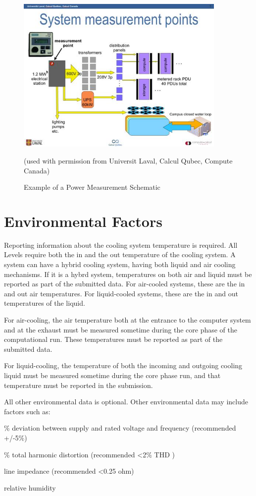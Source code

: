 \begin{figure}
\centering
\includegraphics[width=4in]{fig3-7}
\caption{Example of a Power Measurement Schematic}
(used with permission from Universit Laval, Calcul Qubec, Compute Canada)
\label{fig:powmeasschem}
\end{figure}


\section{Environmental Factors}
\label{sec:EF}
\noindent
Reporting information about the cooling system temperature is required.  
All Levels require both the in and the out temperature of the cooling system. 
A system can have a hybrid cooling system, having both liquid and air cooling mechanisms.  
If it is a hybrd system, temperatures on both air and liquid must be reported as part of the submitted data.
For air-cooled systems, these are the in and out air temperatures. 
For liquid-cooled systems, these are the in and out temperatures of the liquid.
\wl

\noindent
For air-cooling, the air temperature both at the entrance to the computer system 
and at the exhaust must be measured sometime during the core phase of the computational run.  
These temperatures must be reported as part of the submitted data.
\wl

\noindent
For liquid-cooling, the temperature of both the incoming and outgoing cooling liquid 
must be measured sometime during the core phase run, and that temperature must be reported in the submission.
\wl

\noindent
All other environmental data is optional. Other environmental data may include factors such as:

\begin{packed_item}
\item[{-}]
\% deviation between supply and rated voltage and frequency (recommended +/-5\%)
\item[{-}]
\% total harmonic distortion (recommended \textless 2\% THD )
\item[{-}]
line impedance (recommended \textless 0.25 ohm)
\item[{-}]
relative humidity
\end{packed_item}

